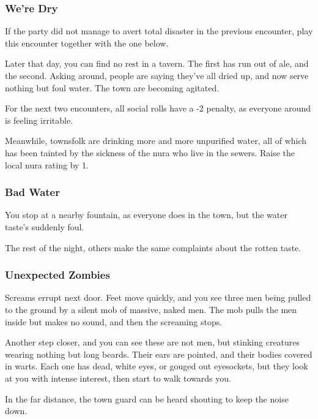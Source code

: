 \subsubsection{We're Dry}
If the party did not manage to avert total disaster in the previous encounter, play this encounter together with the one below.

\begin{boxtext}
	Later that day, you can find no rest in a tavern.  The first has run out of ale, and the second.  Asking around, people are saying they've all dried up, and now serve nothing but foul water.  The town are becoming agitated.
\end{boxtext}

For the next two encounters, all social rolls have a -2 penalty, as everyone around is feeling irritable.

Meanwhile, townsfolk are drinking more and more unpurified water, all of which has been tainted by the sickness of the nura who live in the sewers.  Raise the local nura rating by 1.




\subsubsection{Bad Water}

\begin{boxtext}
	You stop at a nearby fountain, as everyone does in the town, but the water taste's suddenly foul.

	The rest of the night, others make the same complaints about the rotten taste.
\end{boxtext}

\subsubsection{Unexpected Zombies}

\begin{boxtext}
	Screams errupt next door.  Feet move quickly, and you see three men being pulled to the ground by a silent mob of massive, naked men.  The mob pulls the men inside but makes no sound, and then the screaming stops.

	Another step closer, and you can see these are not men, but stinking creatures wearing nothing but long beards.  Their ears are pointed, and their bodies covered in warts.  Each one has dead, white eyes, or gouged out eyesockets, but they look at you with intense interest, then start to walk towards you.

	In the far distance, the town guard can be heard shouting to keep the noise down.

\end{boxtext}

